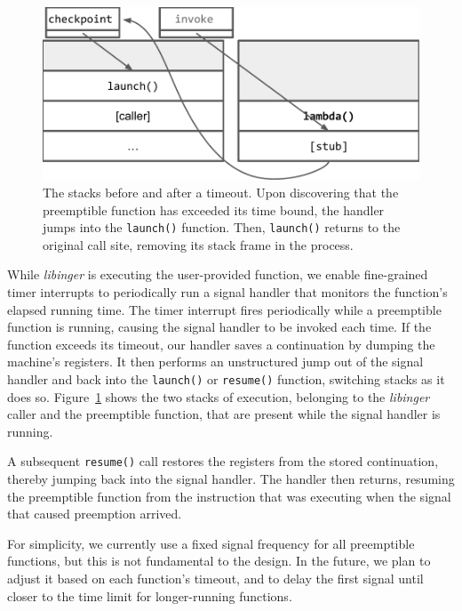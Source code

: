 \begin{figure}
\includegraphics[width=\columnwidth]{figs/twostacks}
\caption{The stacks before and after a timeout.  \textnormal{Upon discovering
that the preemptible function has exceeded its time bound, the handler jumps into the
\texttt{launch()} function.  Then, \texttt{launch()} returns to the original call
site, removing its stack frame in the process.}}
\label{fig:twostacks}
\end{figure}

While \textit{libinger} is executing the user-provided function, we
enable fine-grained timer interrupts to periodically run a signal handler
that monitors the function's elapsed running time.  The timer interrupt fires
periodically while a preemptible function is running, causing the signal
handler to be invoked each time.  If the function exceeds its timeout,
our handler saves a continuation by dumping the machine's registers.  It then
performs an unstructured jump out of the signal handler and back into the
\texttt{launch()} or \texttt{resume()} function, switching stacks as it does so.
Figure~\ref{fig:twostacks} shows the two stacks of execution, belonging to the
\textit{libinger} caller and the preemptible function, that are present while the
signal handler is running.

A subsequent \texttt{resume()} call restores the registers from the stored
continuation, thereby jumping back into the signal handler.  The handler then
returns, resuming the preemptible function from the instruction that was executing
when the signal that caused preemption arrived.

For simplicity, we currently use a fixed signal frequency for all preemptible
functions, but this is not fundamental to the design.  In the future, we plan to
adjust it based on each function's timeout, and to delay the first signal until
closer to the time limit for longer-running functions.

